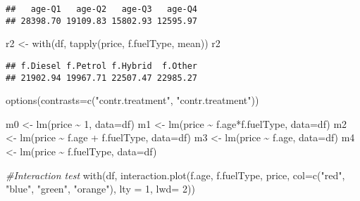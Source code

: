 \documentclass[
]{article}
\newenvironment{Shaded}{\begin{snugshade}}{\end{snugshade}}
\newcommand{\AttributeTok}[1]{\textcolor[rgb]{0.77,0.63,0.00}{#1}}
\newcommand{\CommentTok}[1]{\textcolor[rgb]{0.56,0.35,0.01}{\textit{#1}}}
\newcommand{\DecValTok}[1]{\textcolor[rgb]{0.00,0.00,0.81}{#1}}
\newcommand{\FunctionTok}[1]{\textcolor[rgb]{0.00,0.00,0.00}{#1}}
\newcommand{\NormalTok}[1]{#1}
\newcommand{\OtherTok}[1]{\textcolor[rgb]{0.56,0.35,0.01}{#1}}
\newcommand{\SpecialCharTok}[1]{\textcolor[rgb]{0.00,0.00,0.00}{#1}}
\newcommand{\StringTok}[1]{\textcolor[rgb]{0.31,0.60,0.02}{#1}}
\begin{document}
\begin{verbatim}
##   age-Q1   age-Q2   age-Q3   age-Q4 
## 28398.70 19109.83 15802.93 12595.97
\end{verbatim}

\begin{Shaded}
\begin{Highlighting}[]
\NormalTok{r2 }\OtherTok{\textless{}{-}} \FunctionTok{with}\NormalTok{(df, }\FunctionTok{tapply}\NormalTok{(price, f.fuelType, mean))}
\NormalTok{r2}
\end{Highlighting}
\end{Shaded}

\begin{verbatim}
## f.Diesel f.Petrol f.Hybrid  f.Other 
## 21902.94 19967.71 22507.47 22985.27
\end{verbatim}

\begin{Shaded}
\begin{Highlighting}[]
\FunctionTok{options}\NormalTok{(}\AttributeTok{contrasts=}\FunctionTok{c}\NormalTok{(}\StringTok{"contr.treatment"}\NormalTok{, }\StringTok{"contr.treatment"}\NormalTok{))}

\NormalTok{m0 }\OtherTok{\textless{}{-}} \FunctionTok{lm}\NormalTok{(price }\SpecialCharTok{\textasciitilde{}} \DecValTok{1}\NormalTok{, }\AttributeTok{data=}\NormalTok{df)}
\NormalTok{m1 }\OtherTok{\textless{}{-}} \FunctionTok{lm}\NormalTok{(price }\SpecialCharTok{\textasciitilde{}}\NormalTok{ f.age}\SpecialCharTok{*}\NormalTok{f.fuelType, }\AttributeTok{data=}\NormalTok{df)}
\NormalTok{m2 }\OtherTok{\textless{}{-}} \FunctionTok{lm}\NormalTok{(price }\SpecialCharTok{\textasciitilde{}}\NormalTok{ f.age }\SpecialCharTok{+}\NormalTok{ f.fuelType, }\AttributeTok{data=}\NormalTok{df)}
\NormalTok{m3 }\OtherTok{\textless{}{-}} \FunctionTok{lm}\NormalTok{(price }\SpecialCharTok{\textasciitilde{}}\NormalTok{ f.age, }\AttributeTok{data=}\NormalTok{df)}
\NormalTok{m4 }\OtherTok{\textless{}{-}} \FunctionTok{lm}\NormalTok{(price }\SpecialCharTok{\textasciitilde{}}\NormalTok{ f.fuelType, }\AttributeTok{data=}\NormalTok{df)}

\CommentTok{\#Interaction test}
\FunctionTok{with}\NormalTok{(df, }\FunctionTok{interaction.plot}\NormalTok{(f.age, f.fuelType, price,}
                          \AttributeTok{col=}\FunctionTok{c}\NormalTok{(}\StringTok{"red"}\NormalTok{, }\StringTok{"blue"}\NormalTok{, }\StringTok{"green"}\NormalTok{, }\StringTok{"orange"}\NormalTok{), }\AttributeTok{lty =} \DecValTok{1}\NormalTok{, }\AttributeTok{lwd=} \DecValTok{2}\NormalTok{))}
\end{Highlighting}
\end{Shaded}
\end{document}
